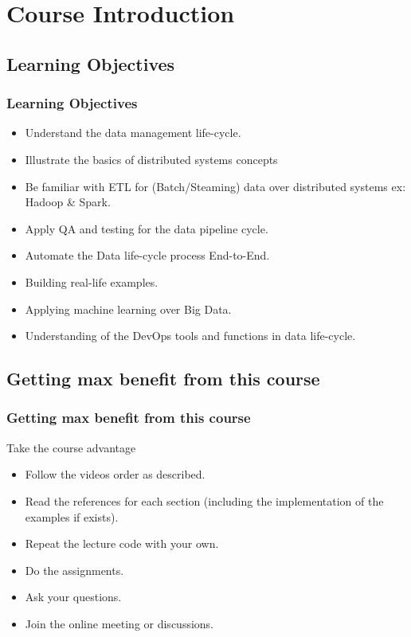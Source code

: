 \section{Course Introduction}

\subsection{Learning Objectives}
\begin{frame}
\frametitle{Learning Objectives}

\begin{itemize}
    \item<1-> Understand the data management life-cycle. \pause
    \item<2-> Illustrate the basics of distributed systems concepts \pause
    \item<3-> Be familiar with ETL for (Batch/Steaming) data over distributed systems ex: Hadoop \& Spark.  \pause
    \item<4-> Apply QA and testing for the data pipeline cycle.
    \item<5-> Automate the Data life-cycle process End-to-End. \pause
    \item<6-> Building real-life examples. \pause
    \item<7-> Applying machine learning over Big Data. \pause
    \item<8-> Understanding of the DevOps tools and functions in data life-cycle. \pause
\end{itemize}

\end{frame}

\subsection{Getting max benefit from this course}

\begin{frame}
\frametitle{Getting max benefit from this course}
\begin{block}{Take the course advantage}
\begin{itemize}
	\item<1-> Follow the videos order as described. \pause
	\item<2-> Read the references for each section (including the implementation of the examples if exists). \pause
	\item<3-> Repeat the lecture code with your own.  \pause
	\item<4-> Do the assignments.\pause
	\item<5-> Ask your questions. \pause
	\item<6-> Join the online meeting or discussions. \pause
\end{itemize}
\end{block}

\end{frame}

